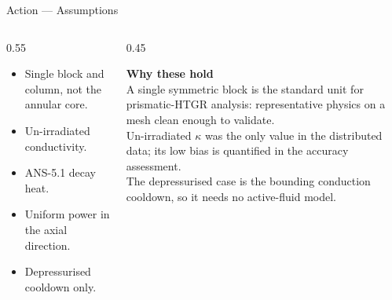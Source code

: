 \documentclass[aspectratio=169, 11pt, t]{beamer}
\begin{document}
\begin{frame}{Action --- Assumptions}
\begin{columns}[T]
\begin{column}{0.55\textwidth}
\begin{itemize}\setlength\itemsep{8pt}\small
  \item Single block and column, not the annular core.
  \item Un-irradiated conductivity.
  \item ANS-5.1 decay heat.
  \item Uniform power in the axial direction.
  \item Depressurised cooldown only.
\end{itemize}
\end{column}
\begin{column}{0.45\textwidth}
\vspace{6pt}
\begin{tcolorbox}[navybox]
{\color{RadNavy}\bfseries Why these hold}\\[3pt]
\footnotesize
A single symmetric block is the standard unit for prismatic-HTGR analysis: representative physics on a mesh clean enough to validate.
\vspace{4pt}\\
Un-irradiated $\kappa$ was the only value in the distributed data; its low bias is quantified in the accuracy assessment.
\vspace{4pt}\\
The depressurised case is the bounding conduction cooldown, so it needs no active-fluid model.
\end{tcolorbox}
\end{column}
\end{columns}
\end{frame}
\end{document}
